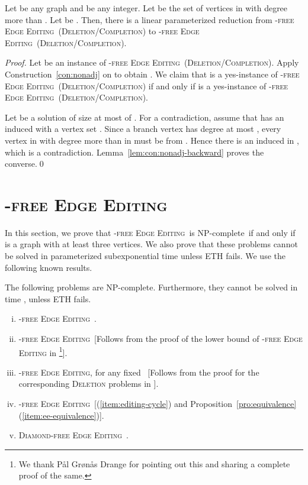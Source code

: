 \documentclass[envcountsame,envcountsect,10pt,oribibl]{llncs}
\newcommand{\pname}[1]{\textnormal{\textsc{#1}}}
\newcommand{\cclass}[1]{\textnormal{\textsf{#1}}}
\newcommand{\HEE}{\pname{-free Edge Editing}}
\newcommand{\HDEE}{\pname{-free Edge Editing}}
\newcommand{\PTEE}{\pname{-free Edge Editing}}
\newcommand{\PFEE}{\pname{-free Edge Editing}}
\newcommand{\CLEE}{\pname{-free Edge Editing}}
\newcommand{\TWKTEE}{\pname{-free Edge Editing}}
\newcommand{\DEE}{\pname{Diamond-free Edge Editing}}
\newcommand{\NPC}{\cclass{NP-complete}}
\begin{document}
\begin{lemma}
  \label{lem:degree}
  Let  be any graph and  be any integer. Let  be the set of vertices
  in  with degree more than .
  Let  be . Then, there is a linear parameterized reduction
  from \HDEE~(\textsc{Deletion}/\textsc{Completion}) to \HEE~(\textsc{Deletion}/\textsc{Completion}).
\end{lemma}
\begin{proof}
  Let  be an instance of \HDEE~(\textsc{Deletion}/\textsc{Completion}).
  Apply Construction~\ref{con:nonadj} on  to obtain .
  We claim that  is a yes-instance of \HDEE~(\textsc{Deletion}/\textsc{Completion})
  if and only if  is a yes-instance of \HEE~(\textsc{Deletion}/\textsc{Completion}).

  Let  be a solution of size at most  of . For a contradiction,
  assume that  has an induced  with a vertex set .
  Since a branch vertex has degree at most , every vertex in 
  with degree more than  in  must be from .
  Hence there is an induced  in , which is a contradiction.
  Lemma~\ref{lem:con:nonadj-backward} proves the converse.\qed
\end{proof}
\section{\HEE}
\label{sec:editing}

In this section, we prove that \HEE\ is \NPC\
if and only if  is a graph with at least three vertices.
We also prove that these problems cannot be solved in 
parameterized subexponential time unless ETH fails.
We use the following known results.

\begin{proposition}
  \label{pro:editing-base}
  The following problems are \NPC. Furthermore, they cannot be 
  solved in time , unless ETH fails.
  \begin{enumerate}[(i)]
  \item\label{item:editing-p3} \PTEE~\cite{komusiewicz2012cluster}.
\item\label{item:editing-p4} \PFEE~[Follows from the proof of the lower 
    bound of \textsc{-free Edge Editing} in \cite        
    {drange2015trivially}\footnote{We thank P{\aa}l Gr{\o}n{\aa}s Drange for pointing out this and sharing a complete proof of the same.}].
  \item\label{item:editing-cycle} \CLEE, for any fixed ~[Follows
    from the proof for the corresponding \textsc{Deletion} problems in \cite{DBLP:journals/siamcomp/Yannakakis81}].
  \item\label{item:editing-2k2} \TWKTEE~[(\ref{item:editing-cycle}) and 
    Proposition~\ref{pro:equivalence}(\ref{item:ee-equivalence})].
  \item\label{item:editing-diamond} \DEE~\cite{DBLP:journals/classification/BarthelemyB01}.
  \end{enumerate}
\end{proposition}
\end{document}
